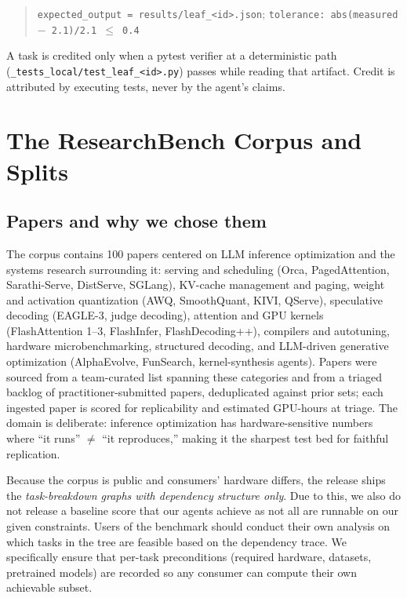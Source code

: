 \documentclass{article}
\begin{document}
\begin{quote}\small
\texttt{expected\_output = results/leaf\_<id>.json};\quad
\texttt{tolerance:\ abs(measured $-$ 2.1)/2.1 $\le$ 0.4}
\end{quote}

A task is credited only when a pytest verifier at a deterministic path
(\texttt{\_tests\_local/test\_leaf\_<id>.py}) passes while reading that
artifact. Credit is attributed by executing tests, never by the agent's
claims.

\section{The ResearchBench Corpus and Splits}
\label{sec:corpus}

\subsection{Papers and why we chose them}

The corpus contains 100 papers centered on LLM inference optimization and the
systems research surrounding it: serving and scheduling (Orca, PagedAttention,
Sarathi-Serve, DistServe, SGLang), KV-cache management and paging, weight and
activation quantization (AWQ, SmoothQuant, KIVI, QServe), speculative
decoding (EAGLE-3, judge decoding), attention and GPU kernels (FlashAttention
1--3, FlashInfer, FlashDecoding++), compilers and autotuning, hardware
microbenchmarking, structured decoding, and LLM-driven generative optimization
(AlphaEvolve, FunSearch, kernel-synthesis agents). Papers were sourced from a
team-curated list spanning these categories and from a triaged backlog of
practitioner-submitted papers, deduplicated against prior sets; each ingested
paper is scored for replicability and estimated GPU-hours at triage. The
domain is deliberate: inference optimization has hardware-sensitive numbers
where ``it runs'' $\neq$ ``it reproduces,'' making it the sharpest test bed
for faithful replication.

Because the corpus is public and consumers' hardware differs, the release
ships the \emph{task-breakdown graphs with dependency structure only}. Due to
this, we also do not release a baseline score that our agents achieve as not
all are runnable on our given constraints. Users of the benchmark should
conduct their own analysis on which tasks in the tree are feasible based on
the dependency trace. We specifically ensure that per-task preconditions
(required hardware, datasets, pretrained models) are recorded so any consumer
can compute their own achievable subset.
\end{document}
